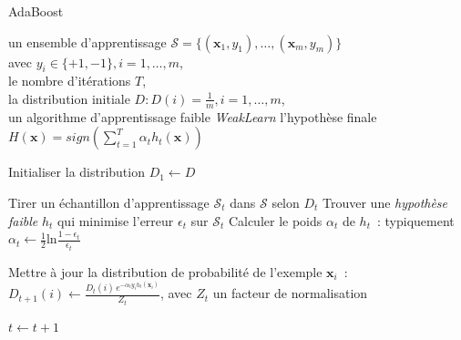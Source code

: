 \documentclass[pdftex,a4paper,11pt]{article}
\newcommand{\vs}[1]{\boldsymbol{#1}} %
\begin{document}
\begin{algorithm}
    \caption{AdaBoost}
    \label{alg:adaboost}
    \begin{algorithmic}
        \REQUIRE un ensemble d'apprentissage 
                 $\mathcal{S} = \{ (\vs{x}_{1},y_{1}),\ldots,(\vs{x}_{m},y_{m}) \}$\\
                 avec $y_{i} \in \{+1, -1\}, i = 1, \dots, m$,\\
            le nombre d'itérations $T$,\\
            la distribution initiale $D : D(i) = \frac{1}{m}, i=1,\ldots,m$,\\
            un algorithme d'apprentissage faible \emph{WeakLearn}
        \ENSURE l'hypothèse finale $H(\vs{x}) = sign(\sum_{t=1}^{T} \alpha_{t} h_{t}(\vs{x}))$

        \STATE Initialiser la distribution $D_1 \leftarrow D$ %

            \STATE Tirer un échantillon d'apprentissage $\mathcal{S}_t$ dans $\mathcal{S}$ selon $D_t$
            \STATE Trouver une \emph{hypothèse faible} $h_t$ qui minimise l'erreur $\epsilon_t$ sur $\mathcal{S}_t$
            \STATE Calculer le poids $\alpha_t$ de $h_t$~:
                   typiquement $\alpha_t \leftarrow \frac{1}{2}\textrm{ln}\frac{1 - \epsilon_t}{\epsilon_t}$ 

                \STATE Mettre à jour la distribution de probabilité de l'exemple $\vs{x}_i$~:\\
                       $D_{t+1}(i) \leftarrow \frac{ D_t(i) \, e^{- \alpha_t y_i h_t(\vs{x}_i)} }{ Z_t }$, 
                       avec $Z_t$ un facteur de normalisation
            \ENDFOR

            \STATE $t \leftarrow t + 1$

        \ENDFOR

    \end{algorithmic}
\end{algorithm}

\end{document}
